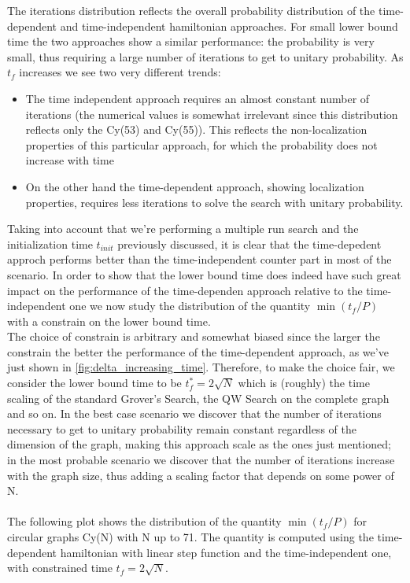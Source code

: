         The iterations distribution reflects the overall probability distribution of the time-dependent and time-independent hamiltonian approaches. For small lower bound time the two approaches show a similar performance: the probability is very small, thus requiring a large number of iterations to get to unitary probability. As $t_f$ increases we see two very different trends:
        \begin{itemize}
            \item The time independent approach requires an almost constant number of iterations (the numerical values is somewhat irrelevant since this distribution reflects only the Cy(53) and Cy(55)). This reflects the non-localization properties of this particular approach, for which the probability does not increase with time
            \item On the other hand the time-dependent approach, showing localization properties, requires less iterations to solve the search with unitary probability.
        \end{itemize}
        Taking into account that we're performing a multiple run search and the initialization time $t_{init}$ previously discussed, it is clear that the time-depedent approch performs better than the time-independent counter part in most of the scenario.
        \clearpage
        In order to show that the lower bound time does indeed have such great impact on the performance of the time-dependen approach relative to the time-independent one we now study the distribution of the quantity $\min(t_f/P)$ with a constrain on the lower bound time. \\ The choice of constrain is arbitrary and somewhat biased since the larger the constrain the better the performance of the time-dependent approach, as we've just shown in \cref{fig:delta_increasing_time}. Therefore, to make the choice fair, we consider the lower bound time to be $t_f^* = 2\sqrt{N}$ which is (roughly) the time scaling of the standard Grover's Search, the QW Search on the complete graph and so on. In the best case scenario we discover that the number of iterations necessary to get to unitary probability remain constant regardless of the dimension of the graph, making this approach scale as the ones just mentioned; in the most probable scenario we discover that the number of iterations increase with the graph size, thus adding a scaling factor that depends on some power of N. \\ \\ The following plot shows the distribution of the quantity $\min(t_f/P)$ for circular graphs Cy(N) with N up to 71. The quantity is computed using the time-dependent hamiltonian with linear step function and the time-independent one, with constrained time $t_f=2 \sqrt{N}$.

